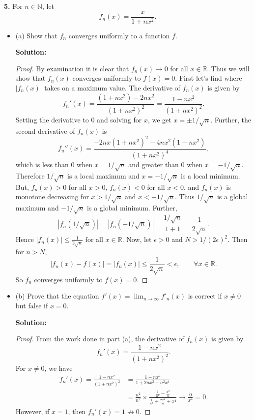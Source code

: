 \documentclass[12pt]{article}
\begin{document}
{\bf 5.} For $n \in \mathbb{N}$, let 
\[ f_{n}(x) = \frac{x}{1+nx^{2}}. \]
\begin{itemize}[label={},leftmargin=4mm, itemsep=1em, parsep=1em]
  \item (a) Show that $f_{n}$ converges uniformly to a function $f$.

  {\bf Solution:} 
  
  \begin{proof}
    By examination it is clear that $f_{n}(x) \rightarrow 0$ for all $x \in
    \mathbb{R}$. 
    Thus we will show that $f_{n}(x)$ converges uniformly to $f(x) = 0$. First let's
    find where $|f_{n}(x)|$ takes on a maximum value. The derivative of
    $f_{n}(x)$ is given by 
    \[ f_{n}'(x) = \frac{(1+nx^{2}) - 2nx^{2}}{(1+nx^{2})^{2}} =
    \frac{1-nx^{2}}{(1+nx^{2})^{2}}. \]
    Setting the derivative to 0 and solving for $x$, we get $x = \pm 1 /
    \sqrt{n}$. Further, the second derivative of $f_{n}(x)$ is 
    \[ f_{n}''(x) = \frac{-2nx(1+nx^{2})^{2} -
    4nx^{2}(1-nx^{2})}{(1+nx^{2})^{4}}, \]
    which is less than 0 when $x = 1/\sqrt{n}$ and greater than 0 when $x =
    -1/\sqrt{n}$. Therefore $1/\sqrt{n}$ is a local maximum and $x =
    -1/\sqrt{n}$ is a local minimum. But, $f_{n}(x) > 0$ for all $x > 0$,
    $f_{n}(x) < 0$ for all $x < 0$, and $f_{n}(x)$ is monotone decreasing for $x
    > 1/\sqrt{n}$ and $x < -1/\sqrt{n}$. Thus $1/\sqrt{n}$ is a global maximum
    and $-1/\sqrt{n}$ is a global minimum. Further,
    \[ |f_{n}(1/\sqrt{n})| = |f_{n}(-1/\sqrt{n})| = \frac{1/\sqrt{n}}{1+1} =
    \frac{1}{2\sqrt{n}}. \]
    Hence $|f_{n}(x)| \leq \frac{1}{2\sqrt{n}}$ for all $x \in \mathbb{R}$. Now,
    let $\epsilon > 0$ and $N > 1 / (2\epsilon)^{2}$. Then for $n > N$,
    \[ |f_{n}(x) - f(x)| = |f_{n}(x)| \leq \frac{1}{2\sqrt{n}} < \epsilon,
    \qquad \forall x \in \mathbb{R}. \]
    So $f_{n}$ converges uniformly to $f(x) = 0$.
  \end{proof}

  \item (b) Prove that the equation $f'(x) = \lim_{n\rightarrow
    \infty}f'_{n}(x)$ is correct if $x\neq 0$ but false if $x = 0$.

  {\bf Solution:}

  \begin{proof}
    From the work done in part (a), the derivative of $f_{n}(x)$ is given by 
    \[ f_{n}'(x) = \frac{1-nx^{2}}{(1+nx^{2})^{2}}. \]
    For $x \neq 0$, we have 
    \begin{align*}
      f_{n}'(x) = \frac{1-nx^{2}}{(1+nx^{2})^{2}} & =
      \frac{1-nx^{2}}{1+2nx^{2}+n^{2}x^{4}} \\
      & = \frac{n^{2}}{n^{2}}\times \frac{\frac{1}{n^{2}} -
      \frac{x^{2}}{n}}{\frac{1}{n^{2}} + \frac{2x^{2}}{n}+x^{4}} \rightarrow
    \frac{0}{x^{4}} = 0.
    \end{align*}
    However, if $x = 1$, then $f_{n}'(x) = 1 \nrightarrow 0$.
  \end{proof}
\end{itemize}
\end{document}
